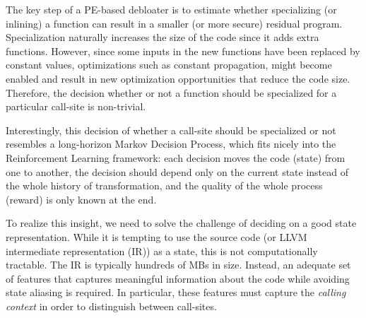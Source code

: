 The key step of a PE-based debloater is to estimate whether specializing (or
inlining) a function can result in a smaller (or more secure) residual program.
Specialization naturally increases the size of the code since it adds extra
functions. However, since some inputs in the new functions have been replaced by
constant values, optimizations such as constant propagation, might become
enabled and result in new optimization opportunities that reduce the code size.
Therefore, the decision whether or not a function should be specialized for a
particular call-site is non-trivial. %


Interestingly, this decision of whether a call-site should be specialized or not resembles a long-horizon Markov Decision Process, which fits nicely into the Reinforcement Learning framework: each decision moves the code (state) from one to another, the decision should depend only on the current state instead of the whole history of transformation, and the quality of the whole process (reward) is only known at the end. 





To realize this insight, we need to solve the challenge of deciding on a good state representation.  While it is tempting to use the source code (or LLVM
intermediate representation (IR)) as a state, this is not
computationally tractable. The IR is typically hundreds of MBs in
size. Instead, an adequate set of features that captures meaningful
information about the code while avoiding state aliasing is
required. In particular, these features must capture the \emph{calling context}
in order to distinguish between call-sites. 

